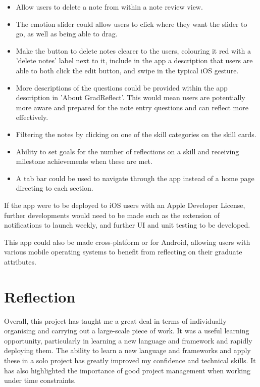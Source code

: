 \documentclass{l4proj}
\begin{document}
\begin{itemize}
    \item Allow users to delete a note from within a note review view.
    \item The emotion slider could allow users to click where they want the slider to go, as well as being able to drag.
    \item Make the button to delete notes clearer to the users, colouring it red with a 'delete notes' label next to it, include in the app a description that users are able to both click the edit button, and swipe in the typical iOS gesture.
    \item More descriptions of the questions could be provided within the app description in 'About GradReflect'. This would mean users are potentially more aware and prepared for the note entry questions and can reflect more effectively.
    \item Filtering the notes by clicking on one of the skill categories on the skill cards.
    \item Ability to set goals for the number of reflections on a skill and receiving milestone achievements when these are met.
    \item A tab bar could be used to navigate through the app instead of a home page directing to each section.
\end{itemize}

If the app were to be deployed to iOS users with an Apple Developer License, further developments would need to be made such as the extension of notifications to launch weekly, and further UI and unit testing to be developed. 

This app could also be made cross-platform or for Android, allowing users with various mobile operating systems to benefit from reflecting on their graduate attributes.

\section{Reflection}

Overall, this project has taught me a great deal in terms of individually organising and carrying out a large-scale piece of work. It was a useful learning opportunity, particularly in learning a new language and framework and rapidly deploying them. The ability to learn a new language and frameworks and apply these in a solo project has greatly improved my confidence and technical skills. It has also highlighted the importance of good project management when working under time constraints. 
\end{document}
